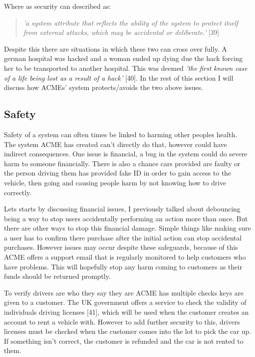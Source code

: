   Where as security can described as:
  \begin{quote}
    \textit{'a system attribute that reflects the ability of the system to protect itself from external attacks, which may be accidental or deliberate.'} [39]
  \end{quote}

  Despite this there are situations in which these two can cross over fully. A german hospital was hacked and a woman ended up dying due the hack forcing her 
  to be transported to another hospital. This was deemed \textit{'the first known case of a life being lost as a result of a hack'} [40].
  In the rest of this section I will discuss how ACMEs' system protects/avoids the two above issues.

  \subsection{Safety}
  Safety of a system can often times be linked to harming other peoples health. The system ACME has created can't directly do that, however could have 
  indirect consequences. One issue is financial, a bug in the system could do severe harm to someone financially. There is also a chance cars provided 
  are faulty or the person driving them has provided fake ID in order to gain access to the vehicle, then going and causing people harm by not knowing 
  how to drive correctly.

  Lets starts by discussing financial issues, I previously talked about debouncing being a way to stop users accidentally performing an action more than
  once. But there are other ways to stop this financial damage. Simple things like making sure a user has to confirm there purchase after the initial 
  action can stop accidental purchases. However issues may occur despite these safeguards, because of this ACME offers a support email that is regularly
  monitored to help customers who have problems. This will hopefully stop any harm coming to customers as their funds should be returned promptly.

  To verify drivers are who they say they are ACME has multiple checks keys are given to a customer. The UK government offers a service to check 
  the validity of individuals driving licenses [41], which will be used when the customer creates an account to rent a vehicle with. However to 
  add further security to this, drivers licenses must be checked when the customer comes into the lot to pick the car up. If something isn't correct,
  the customer is refunded and the car is not rented to them.

